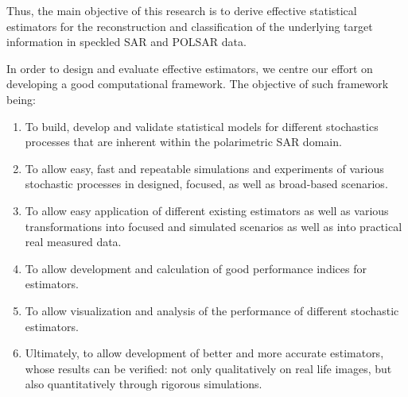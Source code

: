 Thus, the main objective of this research is to derive effective statistical estimators for the reconstruction and classification of the underlying target information in speckled SAR and POLSAR data.

In order to design and evaluate effective estimators, we centre our effort on developing a good computational framework. 
The objective of such framework being:
\begin{enumerate}
\item To build, develop and validate statistical models for different stochastics processes that are inherent within the polarimetric SAR domain.
\item To allow easy, fast and repeatable simulations and experiments of various stochastic processes in designed, focused, as well as broad-based scenarios.
\item To allow easy application of different existing estimators as well as various transformations into focused and simulated scenarios as well as into practical real measured data.
\item To allow development and calculation of good performance indices for estimators. 
\item To allow visualization and analysis of the performance of different stochastic estimators.
\item Ultimately, to allow development of better and more accurate estimators, whose results can be verified: not only qualitatively on real life images, but also quantitatively through rigorous simulations.
\end{enumerate}

